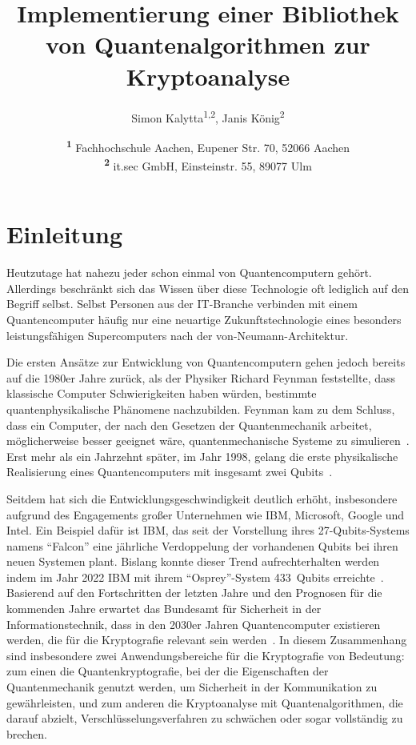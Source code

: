 \documentclass[
  a4paper, %
  10pt, %
  unnumberedsections, %
  twoside, %
]{LTJournalArticle}
\title{Implementierung einer Bibliothek von Quantenalgorithmen zur Kryptoanalyse} %
\author{%
  Simon Kalytta\textsuperscript{1,2}, Janis König\textsuperscript{2}
}
\date{%
  \footnotesize\textsuperscript{\textbf{1}}%
  Fachhochschule Aachen, 
  Eupener Str. 70, 52066 Aachen\\
  \textsuperscript{\textbf{2}}%
  it.sec GmbH,
  Einsteinstr. 55, 89077 Ulm%
}
\begin{document}
\maketitle %


\section{Einleitung}

Heutzutage hat nahezu jeder schon einmal von Quantencomputern gehört.
Allerdings beschränkt sich das Wissen über diese Technologie oft lediglich auf den Begriff selbst.
Selbst Personen aus der IT-Branche verbinden mit einem Quantencomputer häufig nur
eine neuartige Zukunftstechnologie eines besonders leistungsfähigen Supercomputers nach der von-Neumann-Architektur.

Die ersten Ansätze zur Entwicklung von Quantencomputern gehen jedoch bereits auf die 1980er Jahre zurück,
als der Physiker Richard Feynman feststellte,
dass klassische Computer Schwierigkeiten haben würden,
bestimmte quantenphysikalische Phänomene nachzubilden.
Feynman kam zu dem Schluss, dass ein Computer,
der nach den Gesetzen der Quantenmechanik arbeitet,
möglicherweise besser geeignet wäre,
quantenmechanische Systeme zu simulieren~\autocite{Feynman:1982}.
Erst mehr als ein Jahrzehnt später, im Jahr 1998,
gelang die erste physikalische Realisierung eines Quantencomputers
mit insgesamt zwei Qubits~\autocite{Chuang:1998ExperimentalIO}.

Seitdem hat sich die Entwicklungsgeschwindigkeit deutlich erhöht,
insbesondere aufgrund des Engagements großer Unternehmen wie IBM, Microsoft, Google und Intel.
Ein Beispiel dafür ist IBM,
das seit der Vorstellung ihres 27-Qubits-Systems namens "`Falcon"'
eine jährliche Verdoppelung der vorhandenen Qubits bei ihren neuen Systemen plant.
Bislang konnte dieser Trend aufrechterhalten werden
indem im Jahr 2022 IBM mit ihrem "`Osprey"'-System 433~Qubits erreichte~\autocite{IBM:2022}.
Basierend auf den Fortschritten der letzten Jahre und
den Prognosen für die kommenden Jahre erwartet
das Bundesamt für Sicherheit in der Informationstechnik,
dass in den 2030er Jahren Quantencomputer existieren werden,
die für die Kryptografie relevant sein werden~\autocite{BSI:2023}.
In diesem Zusammenhang sind insbesondere zwei Anwendungsbereiche für die Kryptografie von Bedeutung:
zum einen die Quantenkryptografie, bei der die Eigenschaften der Quantenmechanik genutzt werden,
um Sicherheit in der Kommunikation zu gewährleisten, und
zum anderen die Kryptoanalyse mit Quantenalgorithmen, die darauf abzielt,
Verschlüsselungsverfahren zu schwächen oder sogar vollständig zu brechen.
\end{document}
